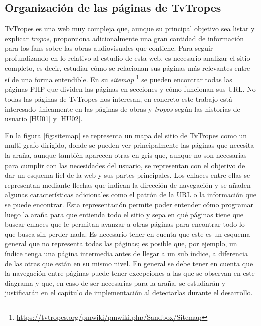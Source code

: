 \subsection{Organización de las páginas de TvTropes}

TvTropes es una web muy compleja que, aunque su principal objetivo sea listar y
explicar \textit{tropos}, proporciona adicionalmente una gran cantidad de
información para los fans sobre las obras audiovisuales que contiene. Para
seguir profundizando en lo relativo al estudio de esta web, es necesario
analizar el sitio completo, es decir, estudiar cómo se relacionan sus páginas
más relevantes entre sí de una forma entendible. En su
\textit{sitemap}
\footnote{\url{https://tvtropes.org/pmwiki/pmwiki.php/Sandbox/Sitemap}} se
pueden encontrar todas las páginas PHP que dividen las páginas en secciones y
cómo funcionan sus URL. No todas las páginas de TvTropes nos interesan, en
concreto este trabajo está interesado únicamente en las páginas de obras y
\textit{tropos} según las historias de usuario
\href{https://github.com/jlgallego99/TropesToGo/issues/6}{[HU01]} y
\href{https://github.com/jlgallego99/TropesToGo/issues/7}{[HU02]}.

En la figura \ref{fig:sitemap} se representa un mapa del sitio de TvTropes como
un multi grafo dirigido, donde se pueden ver principalmente las páginas que
necesita la araña, aunque también aparecen otras en gris que, aunque no son
necesarias para cumplir con las necesidades del usuario, se representan con el
objetivo de dar un esquema fiel de la web y sus partes principales. Los enlaces
entre ellas se representan mediante flechas que indican la dirección de
navegación y se añaden algunas características adicionales como el patrón de la
URL o la información que se puede encontrar. Esta representación permite poder
entender cómo programar luego la araña para que entienda todo el sitio y sepa en
qué páginas tiene que buscar enlaces que le permitan avanzar a otras páginas
para encontrar todo lo que busca sin perder nada. Es necesario tener en cuenta
que este es un esquema general que no representa todas las páginas; es posible
que, por ejemplo, un índice tenga una página intermedia antes de llegar a un sub
índice, a diferencia de las otras que están en su mismo nivel. En general se
debe tener en cuenta que la navegación entre páginas puede tener excepciones a
las que se observan en este diagrama y que, en caso de ser necesarias para la
araña, se estudiarán y justificarán en el capítulo de implementación al
detectarlas durante el desarrollo.

